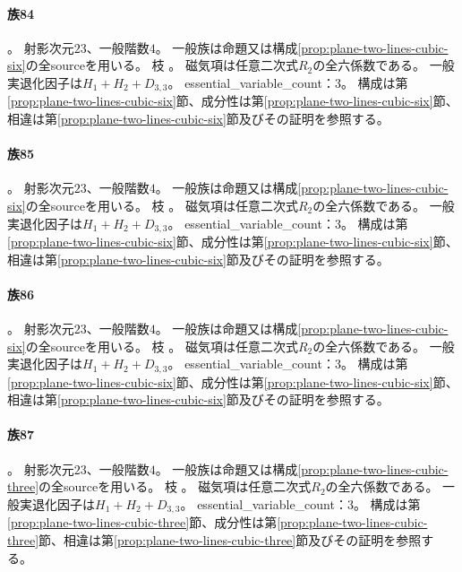 \paragraph{族84}\label{catalogue:R4_PLANE_TWO_LINES_CUBIC_CUSP_FLEX_CUSP_SECANT_23}
。
射影次元$23$、一般階数$4$。
一般族は命題又は構成\ref{prop:plane-two-lines-cubic-six}の全sourceを用いる。
枝 。
磁気項は任意二次式$R_2$の全六係数である。
一般実退化因子は$H_{1}+H_{2}+D_{3,3}$。
essential\_variable\_count：3。
構成は第\ref{prop:plane-two-lines-cubic-six}節、成分性は第\ref{prop:plane-two-lines-cubic-six}節、相違は第\ref{prop:plane-two-lines-cubic-six}節及びその証明を参照する。

\paragraph{族85}\label{catalogue:R4_PLANE_TWO_LINES_CUBIC_CUSP_TANGENT_CUSP_SECANT_23}
。
射影次元$23$、一般階数$4$。
一般族は命題又は構成\ref{prop:plane-two-lines-cubic-six}の全sourceを用いる。
枝 。
磁気項は任意二次式$R_2$の全六係数である。
一般実退化因子は$H_{1}+H_{2}+D_{3,3}$。
essential\_variable\_count：3。
構成は第\ref{prop:plane-two-lines-cubic-six}節、成分性は第\ref{prop:plane-two-lines-cubic-six}節、相違は第\ref{prop:plane-two-lines-cubic-six}節及びその証明を参照する。

\paragraph{族86}\label{catalogue:R4_PLANE_TWO_LINES_CUBIC_CUSP_CUSP_TANGENT_ORDINARY_TANGENT_23}
。
射影次元$23$、一般階数$4$。
一般族は命題又は構成\ref{prop:plane-two-lines-cubic-six}の全sourceを用いる。
枝 。
磁気項は任意二次式$R_2$の全六係数である。
一般実退化因子は$H_{1}+H_{2}+D_{3,3}$。
essential\_variable\_count：3。
構成は第\ref{prop:plane-two-lines-cubic-six}節、成分性は第\ref{prop:plane-two-lines-cubic-six}節、相違は第\ref{prop:plane-two-lines-cubic-six}節及びその証明を参照する。

\paragraph{族87}\label{catalogue:R4_PLANE_TWO_LINES_CUBIC_NODE_TWO_FLEXES_23}
。
射影次元$23$、一般階数$4$。
一般族は命題又は構成\ref{prop:plane-two-lines-cubic-three}の全sourceを用いる。
枝 。
磁気項は任意二次式$R_2$の全六係数である。
一般実退化因子は$H_{1}+H_{2}+D_{3,3}$。
essential\_variable\_count：3。
構成は第\ref{prop:plane-two-lines-cubic-three}節、成分性は第\ref{prop:plane-two-lines-cubic-three}節、相違は第\ref{prop:plane-two-lines-cubic-three}節及びその証明を参照する。

